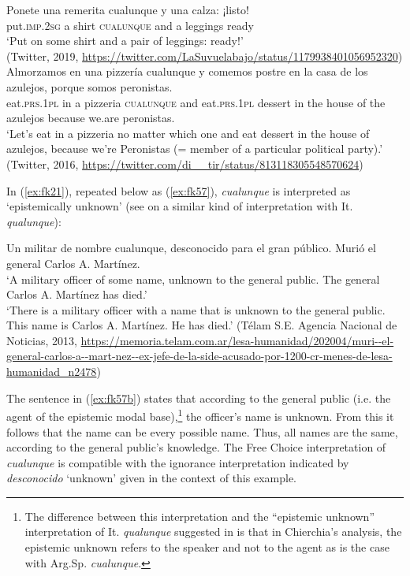 \documentclass[output=paper,colorlinks,citecolor=brown]{langscibook}
\begin{document}
\ea \label{ex:fk55}
    \gll Ponete una remerita cualunque y una calza: ¡listo!\\
    put.\textsc{imp.2sg} a shirt \textsc{cualunque} and a leggings ready\\
    \glt ‘Put on some shirt and a pair of leggings: ready!’\\
    (Twitter, 2019, \url{https://twitter.com/LaSuvuelabajo/status/1179938401056952320})\\
    
    \ex \label{ex:fk56}
    \gll Almorzamos en una pizzería cualunque y comemos postre en la casa de los azulejos, porque somos peronistas.\\
    eat.\textsc{prs.1pl} in a pizzeria \textsc{cualunque} and eat.\textsc{prs.1pl} dessert in the house of the azulejos because we.are peronistas.\\
    \glt ‘Let’s eat in a pizzeria no matter which one and eat dessert in the house of azulejos, because we’re Peronistas (= member of a particular political party).’\\
    (Twitter, 2016, \url{https://twitter.com/di__tir/status/813118305548570624})\\
\z

In (\ref{ex:fk21}), repeated below as (\ref{ex:fk57}), \textit{cualunque} is interpreted as ‘epistemically unknown’ (see \cite{Chierchia2013} on a similar kind of interpretation with It. \textit{qualunque}):

\ea \label{ex:fk57}
     Un militar de nombre cualunque, desconocido para el gran público. Murió el general Carlos A. Martínez.\\
    \ea\label{ex:fk57a} ‘A military officer of some name, unknown to the general public. The general Carlos A. Martínez has died.’\\
    \ex\label{ex:fk57b} ‘There is a military officer with a name that is unknown to the general public. This name is Carlos A. Martínez. He has died.’
    \z
    (Télam S.E. Agencia Nacional de Noticias, 2013, \url{https://memoria.telam.com.ar/lesa-humanidad/202004/muri--el-general-carlos-a--mart-nez--ex-jefe-de-la-side-acusado-por-1200-cr-menes-de-lesa-humanidad_n2478})
\z

The sentence in (\ref{ex:fk57b}) states that according to the general public (i.e. the agent of the epistemic modal base),\footnote{The difference between this interpretation and the “epistemic unknown” interpretation of It. \textit{qualunque} suggested in \citet{Chierchia2013} is that in Chierchia’s analysis, the epistemic unknown refers to the speaker and not to the agent as is the case with Arg.Sp. \textit{cualunque}.}  the officer’s name is unknown. From this it follows that the name can be every possible name. Thus, all names are the same, according to the general public’s knowledge. The Free Choice interpretation of \textit{cualunque} is compatible with the ignorance interpretation indicated by \textit{desconocido} ‘unknown’ given in the context of this example.\largerpage[2]
\end{document}
